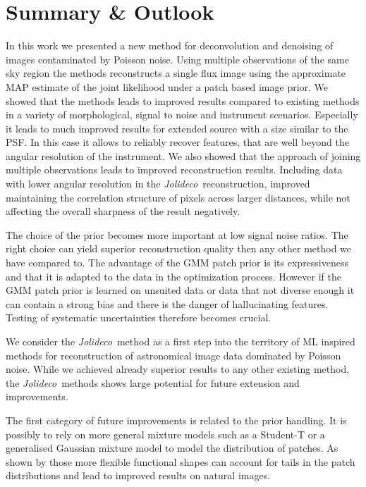 \documentclass[twocolumn]{aastex631}
\newcommand{\jolideco}{\textit{Jolideco}~}
\begin{document}
    \section{Summary \& Outlook}
    In this work we presented a new method for deconvolution and denoising of images contaminated by Poisson noise. Using multiple observations of the same sky region the methods reconstructs a single flux image using the approximate MAP estimate of the joint likelihood under a patch based image prior. We showed that the methods leads to improved results compared to existing methods in a variety of morphological, signal to noise and instrument scenarios. Especially it leads to much improved results for extended source with a size similar to the PSF. In this case it allows to reliably recover features, that are well beyond the angular resolution of the instrument. We also showed that the approach of joining multiple observations leads to improved reconstruction results. Including data with lower angular resolution in the \jolideco reconstruction, improved maintaining the correlation structure of pixels across larger distances, while not affecting the overall sharpness of the result negatively.

    The choice of the prior becomes more important at low signal noise ratios. The right choice can yield superior reconstruction quality then any other method we have compared to. The advantage of the GMM patch prior is its expressiveness and that it is adapted to the data in the optimization process. However if the GMM patch prior is learned on unsuited data or data that not diverse enough it can contain a strong bias and there is the danger of hallucinating features. Testing of systematic uncertainties therefore becomes crucial.

    We consider the \jolideco method as a first step into the territory of ML inspired methods for reconstruction of astronomical image data dominated by Poisson noise. While we achieved already superior results to any other existing method, the \jolideco methods shows large potential for future extension and improvements.
    
    The first category of future improvements is related to the prior handling. It is possibly to rely on more general mixture models such as a Student-T or a generalised Gaussian mixture model to model the distribution of patches. As shown by \cite{VanDenOord2014} those more flexible functional shapes can account for tails in the patch distributions and lead to improved results on natural images.
    
\end{document}
